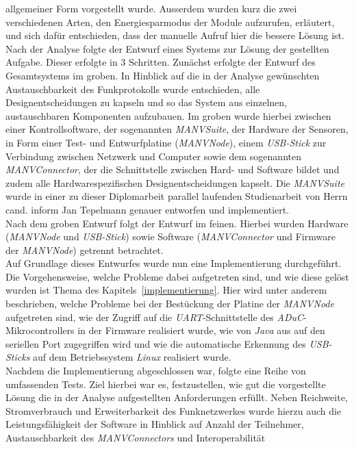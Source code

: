 allgemeiner Form vorgestellt wurde.  Ausserdem wurden kurz die zwei verschiedenen Arten, 
den Energiesparmodus der Module aufzurufen, erläutert, und sich dafür entschieden, dass der manuelle 
Aufruf hier die bessere Lösung ist.\\
Nach der Analyse folgte der Entwurf eines Systems zur Lösung der gestellten Aufgabe. Dieser erfolgte in 3 
Schritten. Zunächst erfolgte der Entwurf des Gesamtsystems im groben. In Hinblick auf die in der Analyse
gewünschten Austauschbarkeit des Funkprotokolls wurde entschieden, alle Designentscheidungen zu kapseln und
so das System aus einzelnen, austauschbaren Komponenten aufzubauen. Im groben wurde hierbei zwischen
einer Kontrollsoftware, der sogenannten \emph{MANVSuite}, der Hardware der Sensoren, in Form einer 
Test- und Entwurfplatine (\emph{MANVNode}), einem \emph{USB-Stick} zur Verbindung zwischen Netzwerk und Computer
sowie dem sogenannten \emph{MANVConnector}, der die Schnittstelle zwischen Hard- und Software bildet und zudem
alle Hardwarespezifischen Designentscheidungen kapselt. Die \emph{MANVSuite} wurde in einer
zu dieser Diplomarbeit parallel laufenden Studienarbeit von Herrn cand. inform Jan Tepelmann genauer entworfen
und implementiert.\cite{Jan}\\
Nach dem groben Entwurf folgt der Entwurf im feinen. Hierbei wurden Hardware (\emph{MANVNode} und \emph{USB-Stick})
sowie Software (\emph{MANVConnector} und Firmware der \emph{MANVNode}) getrennt betrachtet.\\
Auf Grundlage dieses Entwurfes wurde nun eine Implementierung durchgeführt. Die Vorgehensweise, welche Probleme
dabei aufgetreten sind, und wie diese gelöst wurden ist Thema des Kapitels~\ref{implementierung}.
Hier wird unter anderem beschrieben, welche Probleme bei der Bestückung der Platine der \emph{MANVNode} aufgetreten
sind, wie der Zugriff auf die \emph{UART}-Schnittstelle des \emph{ADuC}-Mikrocontrollers in der Firmware
realisiert wurde, wie von \emph{Java} aus auf den seriellen Port zugegriffen wird und wie die automatische
Erkennung des \emph{USB-Sticks} auf dem Betriebssystem \emph{Linux} realisiert wurde.\\
Nachdem die Implementierung abgeschlossen war, folgte eine Reihe von umfassenden Tests. Ziel hierbei war es,
festzustellen, wie gut die vorgestellte Lösung die in der Analyse aufgestellten Anforderungen erfüllt. Neben
Reichweite, Stromverbrauch und Erweiterbarkeit des Funknetzwerkes wurde hierzu auch die Leistungsfähigkeit der 
Software in Hinblick auf Anzahl der Teilnehmer, Austauschbarkeit des \emph{MANVConnectors} und Interoperabilität
